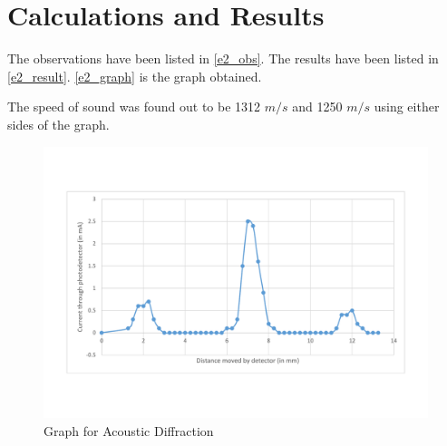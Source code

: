 \section{Calculations and Results}
	The observations have been listed in \autoref{e2_obs}. The results have been listed in \autoref{e2_result}. \autoref{e2_graph} is the graph obtained.
	\par
	The speed of sound was found out to be 1312 $m/s$ and 1250 $m/s$ using either sides of the graph.

	\begin{figure}[bth]
		\begin{center}
			\includegraphics[width=1.3\linewidth]{gfx/e2_graph}
		\end{center}
		\caption[Graph]{Graph for Acoustic Diffraction}
	\label{e2_graph}

	\end{figure}

